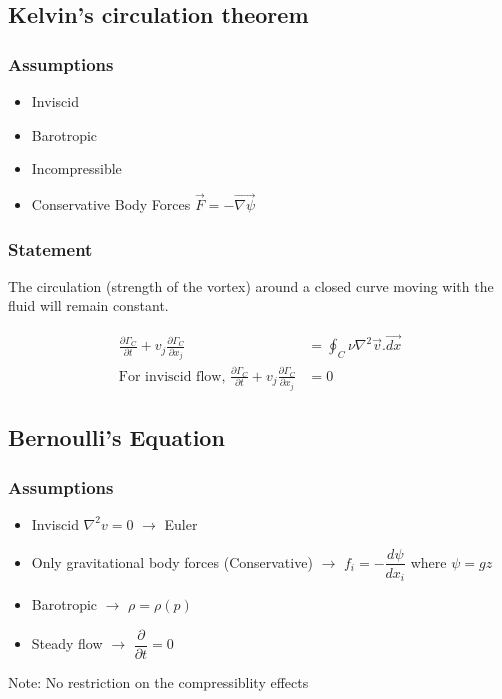 \documentclass[11pt, letterpaper, notitlepage]{article}
\begin{document}
\subsection{Kelvin's circulation theorem}
\subsubsection{Assumptions}
\begin{itemize}
\item Inviscid
\item Barotropic
\item Incompressible
\item Conservative Body Forces $\vec{F} = -\vec{\nabla{\psi}}$
\end{itemize}

\subsubsection{Statement}
The circulation (strength of the vortex) around a closed curve moving with the fluid will remain constant.

\begin{align*}
\frac{\partial \Gamma_C}{\partial t} + v_j \frac{\partial \Gamma_C}{\partial x_j} &= \oint_{C}^{} \nu \nabla^2\vec{v}.\vec{dx} \\
\text{For inviscid flow, } \frac{\partial \Gamma_C}{\partial t} + v_j \frac{\partial \Gamma_C}{\partial x_j} &= 0
\end{align*}

\subsection{Bernoulli's Equation}
\subsubsection{Assumptions}
\begin{itemize}
\item Inviscid $\nabla^2 v = 0$ $\rightarrow$ Euler
\item Only gravitational body forces (Conservative) $\rightarrow$ $f_i = -\dfrac{d \psi}{dx_i}$ where $\psi = g z$
\item Barotropic $\rightarrow$ $\rho = \rho(p)$
\item Steady flow $\rightarrow$ $\dfrac{\partial}{\partial t} = 0$ 
\end{itemize}
Note: No restriction on the compressiblity effects
\end{document}
